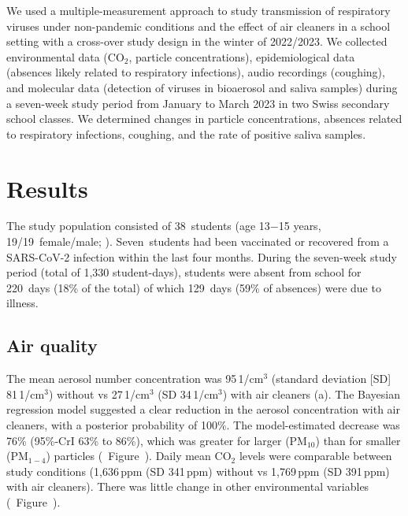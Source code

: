 \documentclass[fleqn,11pt]{wlscirep}
\begin{document}

We used a multiple-measurement approach to study transmission of respiratory viruses under non-pandemic conditions and the effect of air cleaners in a school setting with a cross-over study design in the winter of 2022/2023. We collected environmental data (CO$_2$, particle concentrations), epidemiological data (absences likely related to respiratory infections), audio recordings (coughing), and molecular data (detection of viruses in bioaerosol and saliva samples) during a seven-week study period from January to March 2023 in two Swiss secondary school classes. We determined changes in particle concentrations, absences related to respiratory infections, coughing, and the rate of positive saliva samples.

\clearpage

\section*{Results}

The study population consisted of 38~students (age 13$-$15 years, 19/19~female/male; ). Seven~students had been vaccinated or recovered from a SARS-CoV-2 infection within the last four months. During the seven-week study period (total of 1,330 student-days), students were absent from school for 220~days (18\% of the total) of which 129~days (59\% of absences) were due to illness.  

\subsection*{Air quality}

The mean aerosol number concentration was 95\,1/cm$^3$ (standard deviation [SD] 81\,1/cm$^3$) without vs 27\,1/cm$^3$ (SD 34\,1/cm$^3$) with air cleaners (a). The Bayesian regression model suggested a clear reduction in the aerosol concentration with air cleaners, with a posterior probability of 100\%. The model-estimated decrease was 76\% (95\%-CrI 63\% to 86\%), which was greater for larger (PM$_{10}$) than for smaller (PM$_{1-4}$) particles (\supp~Figure~). Daily mean CO$_2$ levels were comparable between study conditions (1,636\,ppm (SD 341\,ppm) without vs 1,769\,ppm (SD 391\,ppm) with air cleaners). There was little change in other environmental variables (\supp~Figure~). 
\end{document}

